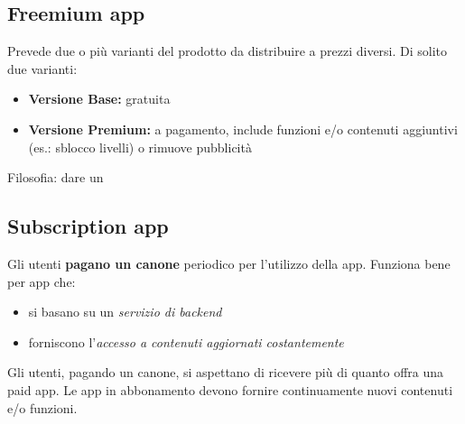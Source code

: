 \subsection{Freemium app}
\par Prevede due o più varianti del prodotto da distribuire a prezzi diversi. Di solito due varianti:
\begin{itemize}
    \item \textbf{Versione Base:} gratuita
    \item \textbf{Versione Premium:} a pagamento, include funzioni e/o contenuti aggiuntivi (es.: sblocco livelli) o rimuove pubblicità
\end{itemize}
\par Filosofia: dare un

\subsection{Subscription app}
\par Gli utenti \textbf{pagano un canone} periodico per l'utilizzo della app. Funziona bene per app che:
\begin{itemize}
    \item si basano su un \textit{servizio di backend}
    \item forniscono l'\textit{accesso a contenuti aggiornati costantemente}
\end{itemize}
\par Gli utenti, pagando un canone, si aspettano di ricevere più di quanto offra una paid app. Le app in abbonamento devono fornire continuamente nuovi contenuti e/o funzioni.

